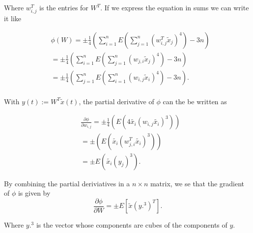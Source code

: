 Where $w_{i,j}^{T}$ is the entries for $W^{T}$. If we express the equation in sums we can write it like

\begin{equation}
\label{eq: Phi 4}
\begin{split}
&\phi \left(W\right)
 = \pm \frac{1}{4} \left( \displaystyle\sum\limits_{i=1}^n E\left(\displaystyle\sum\limits_{j=1}^n \left( w_{i,j}^{T} \tilde{x}_{j} \right)^{4} \right)-3n\right)\\
& = \pm \frac{1}{4} \left( \displaystyle\sum\limits_{i=1}^n E\left(\displaystyle\sum\limits_{j=1}^n \left( w_{j,i} \tilde{x}_{j} \right)^{4} \right)-3n\right)\\
& =\pm \frac{1}{4} \left( \displaystyle\sum\limits_{j=1}^n E\left(\displaystyle\sum\limits_{i=1}^n \left( w_{i,j} \tilde{x}_{i} \right)^{4} \right)-3n\right).\\
\end{split}
\end{equation}

With $y(t):=W^{T}\tilde{x}(t)$, the partial derivative of $\phi$ can the be written as

\begin{equation}
\label{eq: PD 1}
\begin{split}
& \frac{\partial \phi}{\partial w_{i,j}} = \pm \frac{1}{4} \left(E\left(4\tilde{x_i}\left(w_{i,j}\tilde{x_i}\right)^3\right)\right)\\
& =\pm \left(E\left(\tilde{x_i}\left(w_{j,i}^{T}\tilde{x_i}\right)^3\right)\right)\\
& = \pm E\left(\tilde{x_i}\left(y_{j}\right)^3\right).
\end{split}
\end{equation}

By combining the partial deriviatives in a $n \times n$ matrix, we se that the gradient of $\phi$ is given by
\begin{equation}
\label{eq: gardient}
\frac{\partial \phi}{\partial W}= \pm E\left[\tilde{x}\left(y.^{3}\right)^{T}\right].
\end{equation}

Where $y.^3$ is the vector whose components are cubes of the components of $y$.

\newpage

